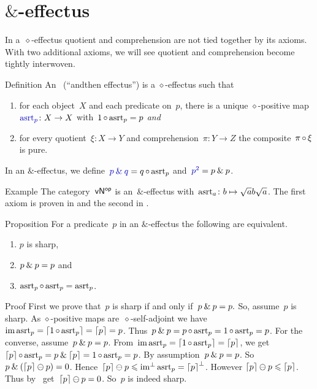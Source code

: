 \documentclass[b]{subfiles}
\begin{document}
\section{$\&$-effectus}
\begin{parsec}%
\begin{point}%
In a~$\diamond$-effectus
    quotient and comprehension are not tied together by its axioms.
    With two additional axioms, we will see quotient and comprehension
    become tightly interwoven.
\end{point}
\begin{point}{Definition}%
An~ (``andthen effectus'')
is a $\diamond$-effectus
such that
\begin{enumerate}
\item
    for each object~$X$
    and each predicate on~$p$,
    there is a unique $\diamond$-positive map~$\Define{\asrt_p}\colon X \to X$
    with~$1 \mathop{\circ} \mathrm{asrt}_p = p$ \emph{and}
\item
    for every quotient~$\xi \colon X \to Y$
    and comprehension~$\pi \colon Y \to Z$
    the composite~$\pi \mathop{\circ} \xi$ is pure.
\end{enumerate}
In an $\&$-effectus,
we define~$\Define{\andthen{p}{q}} = q \after \asrt_p$
    and~$\Define{p^2} = \andthen{p}{p}$.
\end{point}
\begin{point}{Example}%
The category~${\mathsf{vN}}{^{\mathsf{op}}}$ is an~$\&$-effectus
    with~$\mathrm{asrt}_a\colon b \mapsto \sqrt{a}b\sqrt{a}$.
The first axiom is proven in 
    and the second in .
\end{point}
\begin{point}{Proposition}%
For a predicate~$p$ in an $\&$-effectus the following are equivalent.
\begin{enumerate}
\item $p$ is sharp,
\item $p \mathbin{\&} p=p$ and
\item $\mathrm{asrt}_p \mathop{\circ} \mathrm{asrt}_p = \mathrm{asrt}_p$.
\end{enumerate}
\begin{point}{Proof}%
First we prove that~$p$ is sharp if and only if~$p \mathbin{\&} p=p.$
So, assume~$p$ is sharp.
As $\diamond$-positive maps are~$\diamond$-self-adjoint
    we have~$\operatorname{im} \mathrm{asrt}_p = \left\lceil1 \mathop{\circ} \mathrm{asrt}_p\right\rceil = \left\lceil p\right\rceil = p$.
Thus~$p \mathbin{\&} p = p \mathop{\circ} \mathrm{asrt}_p = 1 \mathop{\circ} \mathrm{asrt}_p = p$.
For the converse, assume~$p \mathbin{\&} p=p$.
From~$\operatorname{im} \mathrm{asrt}_p = \left\lceil1 \mathop{\circ} \mathrm{asrt}_p\right\rceil = \left\lceil p\right\rceil$,
we get~$\left\lceil p\right\rceil \mathop{\circ} \mathrm{asrt}_p = p \mathbin{\&} \left\lceil p\right\rceil = 1 \mathop{\circ} \mathrm{asrt}_p = p$.
By assumption~$p \mathbin{\&} p=p$.
So~$p \mathbin{\&} (\left\lceil p\right\rceil \ominus p) = 0$.
Hence~$\left\lceil p\right\rceil\ominus p \leqslant \operatorname{im^\perp} \mathrm{asrt}_p = \left\lceil p\right\rceil^\perp$.
However $\left\lceil p\right\rceil\ominus p \leqslant \left\lceil p\right\rceil$.
Thus by~
    get~$\left\lceil p\right\rceil \ominus p = 0$. So~$p$ is indeed sharp.


\end{point}
\end{point}
\end{parsec}
\end{document}
